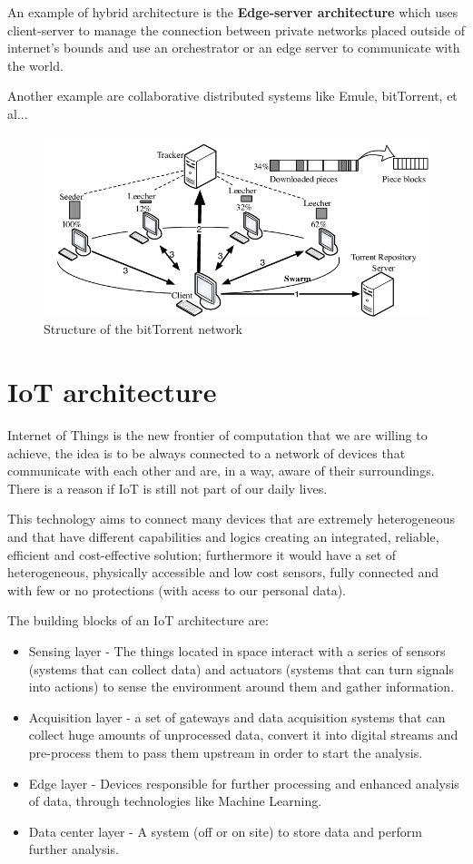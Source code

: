An example of hybrid architecture is the \textbf{Edge-server architecture} which uses client-server to manage the connection between private networks placed outside of internet's bounds and use an orchestrator or an edge server to communicate with the world.

Another example are collaborative distributed systems like Emule, bitTorrent, et al...
\begin{figure}[htb]
    \centering
    \includegraphics[scale=0.45]{img/bittorrent.png}
    \caption{Structure of the bitTorrent network}
\end{figure}

\section{IoT architecture}
Internet of Things is the new frontier of computation that we are willing to achieve, the idea is to be always connected to a network of devices that communicate with each other and are, in a way, aware of their surroundings. There is a reason if IoT is still not part of our daily lives.

This technology aims to connect many devices that are extremely heterogeneous and that have different capabilities and logics creating an integrated, reliable, efficient and cost-effective solution; furthermore it would have a set of heterogeneous, physically accessible and low cost sensors, fully connected and with few or no protections (with acess to our personal data).

The building blocks of an IoT architecture are:
\begin{itemize}
    \item Sensing layer - The things located in space interact with a series of sensors (systems that can collect data) and actuators (systems that can turn signals into actions) to sense the environment around them and gather information.
    \item Acquisition layer - a set of gateways and data acquisition systems that can collect huge amounts of unprocessed data, convert it into digital streams and pre-process them to pass them upstream in order to start the analysis.
    \item Edge layer - Devices responsible for further processing and enhanced analysis of data, through technologies like Machine Learning.
    \item Data center layer - A system (off or on site) to store data and perform further analysis.
\end{itemize}
